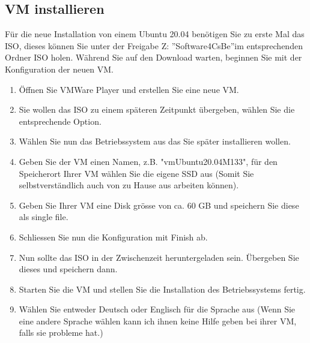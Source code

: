 \subsection{VM installieren}\label{subsec:vminstallieren}
\begin{frame}[fragile]
    Für die neue Installation von einem Ubuntu 20.04 benötigen Sie zu erste Mal das ISO, dieses können Sie
    unter der Freigabe Z: \textquotedblright Software4CsBe\textquotedblright\space im entsprechenden Ordner ISO holen.
    Während Sie auf den Download warten, beginnen Sie mit der Konfiguration der neuen VM.
\end{frame}

\begin{frame}[fragile]
    \begin{enumerate}
        \item Öffnen Sie VMWare Player und erstellen Sie eine neue VM.
        \item Sie wollen das ISO zu einem späteren Zeitpunkt übergeben, wählen Sie die entsprechende Option.
        \item Wählen Sie nun das Betriebssystem aus das Sie später installieren wollen.
        \item Geben Sie der VM einen Namen, z.B. "vmUbuntu20.04\textunderscore M133", für den Speicherort Ihrer VM wählen Sie die eigene
        SSD aus (Somit Sie selbstverständlich auch von zu Hause aus arbeiten können).
         \newpage
        \item Geben Sie Ihrer VM eine Disk grösse von ca. 60 GB und speichern Sie diese als single file.
        \item Schliessen Sie nun die Konfiguration mit Finish ab.
        \item Nun sollte das ISO in der Zwischenzeit heruntergeladen sein.
        Übergeben Sie dieses und speichern dann.
        \item Starten Sie die VM und stellen Sie die Installation des Betriebssystems fertig.
        \item Wählen Sie entweder Deutsch oder Englisch für die Sprache aus (Wenn Sie eine andere Sprache wählen kann ich ihnen keine Hilfe geben bei ihrer VM, falls sie probleme hat.)

\end{enumerate}
\end{frame}
